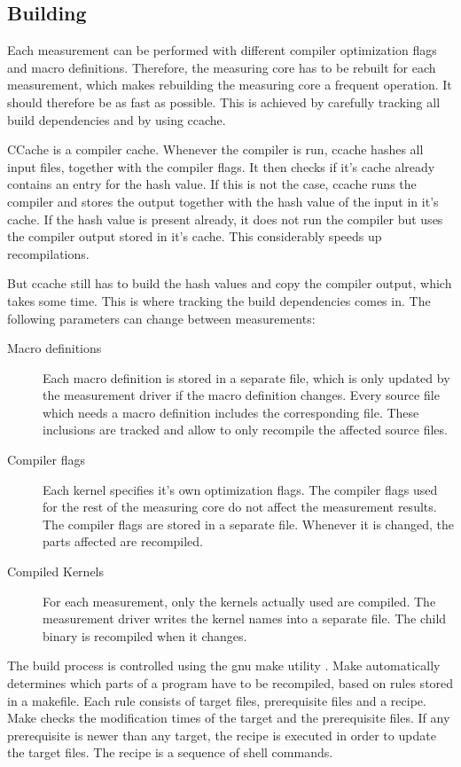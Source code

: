 \documentclass[a4paper,12pt]{report}
\begin{document}
\subsection{Building}
Each measurement can be performed with different compiler optimization flags and
macro definitions. Therefore, the measuring core has to be rebuilt for each
measurement, which makes rebuilding the measuring core a frequent operation. It
should therefore be as fast as possible. This is achieved by carefully tracking
all build dependencies and by using ccache. 

CCache is a compiler cache. Whenever the compiler is run, ccache hashes all
input files, together with the compiler flags. It then checks if it's cache
already contains an entry for the hash value. If this is not the case, ccache
runs the compiler and stores the output together with the hash value of the
input in it's cache. If the hash value is present already, it does not run the
compiler but uses the compiler output stored in it's cache. This considerably
speeds up recompilations.

But ccache still has to build the hash values and copy the compiler output,
which takes some time. This is where tracking the build dependencies comes in.
The following parameters can change between measurements:
\begin{description}
\item[Macro definitions]
Each macro definition is stored in a separate file, which is only updated by the
measurement driver if the macro definition changes. Every source file which
needs a macro definition includes the corresponding file. These inclusions are
tracked and allow to only recompile the affected source files.
\item[Compiler flags] 
Each kernel specifies it's own optimization flags. The compiler flags used for
the rest of the measuring core do not affect the measurement results. The compiler
flags are stored in a separate file. Whenever it is changed, the parts affected
are recompiled.
\item[Compiled Kernels]
For each measurement, only the kernels actually used are compiled. The
measurement driver writes the kernel names into a separate file. The child
binary is recompiled when it changes.
\end{description}

The build process is controlled using the gnu make utility \cite{make}. Make
automatically determines which parts of a program have to be recompiled, based
on rules stored in a makefile. Each rule consists of target files, prerequisite
files and a recipe. Make checks the modification times of the target and the
prerequisite files. If any prerequisite is newer than any target, the recipe is
executed in order to update the target files. The recipe is a sequence of shell
commands.
\end{document}
